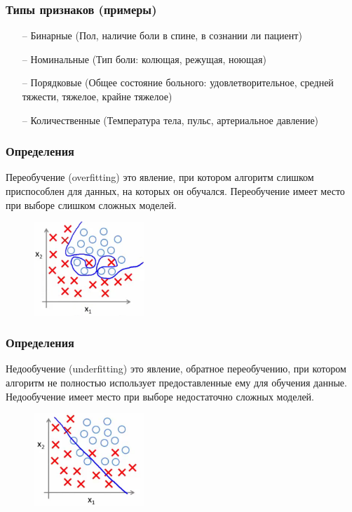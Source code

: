 \documentclass[12pt]{beamer}
\begin{document}
\begin{frame}\frametitle{Типы признаков (примеры)}
\begin{itemize}
  \item[--] Бинарные (Пол, наличие боли в спине, в сознании ли пациент)
  \item[--] Номинальные (Тип боли: колющая, режущая, ноющая)
  \item[--] Порядковые (Общее состояние больного: удовлетворительное, средней тяжести, тяжелое, крайне тяжелое)
  \item[--] Количественные (Температура тела, пульс, артериальное давление)
\end{itemize}
\end{frame}


\begin{frame}\frametitle{Определения}
Переобучение (overfitting) это явление, при котором алгоритм слишком приспособлен для данных, на которых он обучался. Переобучение имеет место при выборе слишком сложных моделей.\\
\vspace{5mm}
\begin{figure}[htbp]
  \includegraphics[height=100pt, keepaspectratio = true]{overfitting}  
\end{figure}

\end{frame}


\begin{frame}\frametitle{Определения}
Недообучение (underfitting) это явление, обратное переобучению, при котором алгоритм не полностью использует предоставленные ему для обучения данные. Недообучение имеет место при выборе недостаточно сложных моделей.
\vspace{5mm}
\begin{figure}[htbp]
  \includegraphics[height=100pt, keepaspectratio = true]{underfitting}  
\end{figure}

\end{frame}
\end{document}
